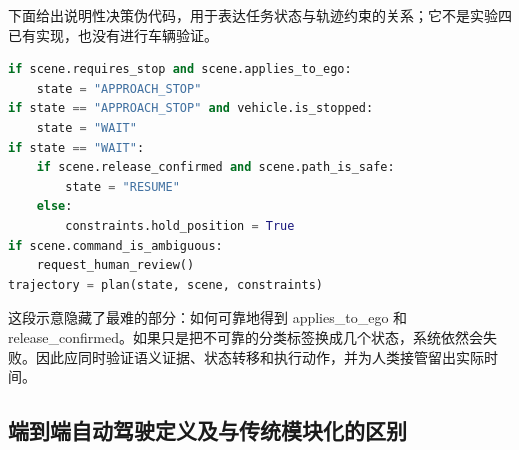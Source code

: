 \documentclass[UTF8,zihao=-4,fontset=windows]{ctexart}
\begin{document}
下面给出说明性决策伪代码，用于表达任务状态与轨迹约束的关系；它不是实验四已有实现，也没有进行车辆验证。
\par\noindent\begin{minipage}{\linewidth}
\begin{lstlisting}[language=Python,caption={临时管制中的任务状态与轨迹约束示意}]
if scene.requires_stop and scene.applies_to_ego:
    state = "APPROACH_STOP"
if state == "APPROACH_STOP" and vehicle.is_stopped:
    state = "WAIT"
if state == "WAIT":
    if scene.release_confirmed and scene.path_is_safe:
        state = "RESUME"
    else:
        constraints.hold_position = True
if scene.command_is_ambiguous:
    request_human_review()
trajectory = plan(state, scene, constraints)
\end{lstlisting}
\end{minipage}\par
这段示意隐藏了最难的部分：如何可靠地得到 applies\_to\_ego 和 release\_confirmed。如果只是把不可靠的分类标签换成几个状态，系统依然会失败。因此应同时验证语义证据、状态转移和执行动作，并为人类接管留出实际时间。

\FloatBarrier
\subsection{端到端自动驾驶定义及与传统模块化的区别}
\end{document}
